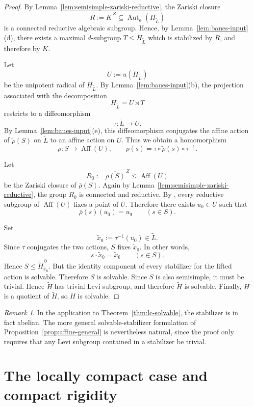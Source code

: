 \documentclass[reqno]{amsart}
\numberwithin{equation}{section}
\theoremstyle{definition}
\theoremstyle{remark}
\newtheorem{remark}[theorem]{Remark}
\DeclareMathOperator{\Aut}{Aut}
\DeclareMathOperator{\Aff}{Aff}
\begin{document}
\begin{proof}
By Lemma~\ref{lem:semisimple-zariski-reductive}, the Zariski closure
\[
R:=\overline{K}^{\,Z}
\subseteq \Aut_a(H_{\widetilde L})
\]
is a connected reductive algebraic subgroup. Hence, by
Lemma~\ref{lem:baues-input}\textup{(d)}, there exists a maximal \(d\)-subgroup
$T\leq H_{\widetilde L}$
which is stabilized by \(R\), and therefore by \(K\).

Let
\[
U:=u(H_{\widetilde L})
\]
be the unipotent radical of \(H_{\widetilde L}\). By
Lemma~\ref{lem:baues-input}\textup{(b)}, the projection associated with the
decomposition
\[
H_{\widetilde L}=U\rtimes T
\]
restricts to a diffeomorphism
\[
\tau\colon \widetilde L\longrightarrow U.
\]
By Lemma~\ref{lem:baues-input}\textup{(e)}, this diffeomorphism conjugates the
affine action of \(\widetilde\rho(S)\) on \(\widetilde L\) to an affine action
on \(U\). Thus we obtain a homomorphism
\[
\overline\rho\colon S\longrightarrow \Aff(U),
\qquad
\overline\rho(s)=\tau\circ\widetilde\rho(s)\circ\tau^{-1}.
\]

Let
\[
R_0:=\overline{\overline\rho(S)}^{\,Z}
\leq \Aff(U)
\]
be the Zariski closure of \(\overline\rho(S)\). Again by
Lemma~\ref{lem:semisimple-zariski-reductive}, the group \(R_0\) is connected
and reductive. By \cite[Lemma~5.3]{Dere}, every reductive subgroup of
\(\Aff(U)\) fixes a point of \(U\). Therefore there exists \(u_0\in U\) such
that
\[
\overline\rho(s)(u_0)=u_0
\qquad
(s\in S).
\]

Set
\[
\widetilde x_0:=\tau^{-1}(u_0)\in \widetilde L.
\]
Since \(\tau\) conjugates the two actions, \(S\) fixes \(\widetilde x_0\).
In other words,
\[
s\cdot \widetilde x_0=\widetilde x_0
\qquad (s\in S).
\]
Hence
$S\leq \widetilde H_{\widetilde x_0}^{\,0}$.
But the identity component of every stabilizer for the lifted action is
solvable. Therefore \(S\) is solvable. Since \(S\) is also semisimple, it must
be trivial.
Hence
\(\widetilde H\) has trivial Levi subgroup, and therefore \(\widetilde H\) is
solvable. Finally, \(H\) is a quotient of \(\widetilde H\), so \(H\) is
solvable.
\end{proof}

\begin{remark}
In the application to Theorem~\ref{thm:lc-solvable}, the stabilizer is in fact
abelian. The more general solvable-stabilizer formulation of
Proposition~\ref{prop:affine-general} is nevertheless natural, since the proof
only requires that any Levi subgroup contained in a stabilizer be trivial.
\end{remark}


\section{The locally compact case and compact rigidity}\label{sec:locally-compact}
\end{document}
